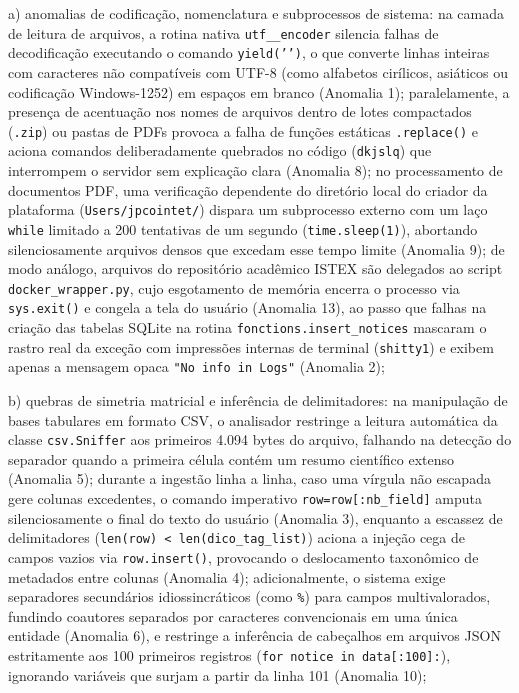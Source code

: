 \documentclass[
	oneside,
	a4paper,
	12pt,
	chapter=TITLE,
	section=TITLE,
	english,
	brazilian
]{abntex2}
\begin{document}
\par\indent a) anomalias de codificação, nomenclatura e subprocessos de sistema: na camada de leitura de arquivos, a rotina nativa \texttt{utf\_\_\allowbreak encoder} silencia falhas de decodificação executando o comando \texttt{yield('{}')}, o que converte linhas inteiras com caracteres não compatíveis com UTF-8 (como alfabetos cirílicos, asiáticos ou codificação Windows-1252) em espaços em branco (Anomalia 1); paralelamente, a presença de acentuação nos nomes de arquivos dentro de lotes compactados (\texttt{.zip}) ou pastas de PDFs provoca a falha de funções estáticas \texttt{.replace()} e aciona comandos deliberadamente quebrados no código (\texttt{dkjslq}) que interrompem o servidor sem explicação clara (Anomalia 8); no processamento de documentos PDF, uma verificação dependente do diretório local do criador da plataforma (\texttt{Users/\allowbreak jpcointet/}) dispara um subprocesso externo com um laço \texttt{while} limitado a 200 tentativas de um segundo (\texttt{time.\allowbreak sleep(1)}), abortando silenciosamente arquivos densos que excedam esse tempo limite (Anomalia 9); de modo análogo, arquivos do repositório acadêmico ISTEX são delegados ao script \texttt{docker\_\allowbreak wrapper.\allowbreak py}, cujo esgotamento de memória encerra o processo via \texttt{sys.\allowbreak exit()} e congela a tela do usuário (Anomalia 13), ao passo que falhas na criação das tabelas SQLite na rotina \texttt{fonctions.\allowbreak insert\_\allowbreak notices} mascaram o rastro real da exceção com impressões internas de terminal (\texttt{shitty1}) e exibem apenas a mensagem opaca \texttt{"No info in Logs"} (Anomalia 2);
\par\indent b) quebras de simetria matricial e inferência de delimitadores: na manipulação de bases tabulares em formato CSV, o analisador restringe a leitura automática da classe \texttt{csv.\allowbreak Sniffer} aos primeiros 4.094 bytes do arquivo, falhando na detecção do separador quando a primeira célula contém um resumo científico extenso (Anomalia 5); durante a ingestão linha a linha, caso uma vírgula não escapada gere colunas excedentes, o comando imperativo \texttt{row=row[:nb\_\allowbreak field]} amputa silenciosamente o final do texto do usuário (Anomalia 3), enquanto a escassez de delimitadores (\texttt{len(row) < len(dico\_\allowbreak tag\_\allowbreak list)}) aciona a injeção cega de campos vazios via \texttt{row.\allowbreak insert()}, provocando o deslocamento taxonômico de metadados entre colunas (Anomalia 4); adicionalmente, o sistema exige separadores secundários idiossincráticos (como \texttt{\textbar{}\%\textbar{}}) para campos multivalorados, fundindo coautores separados por caracteres convencionais em uma única entidade (Anomalia 6), e restringe a inferência de cabeçalhos em arquivos JSON estritamente aos 100 primeiros registros (\texttt{for notice in data[:100]:}), ignorando variáveis que surjam a partir da linha 101 (Anomalia 10);
\end{document}
